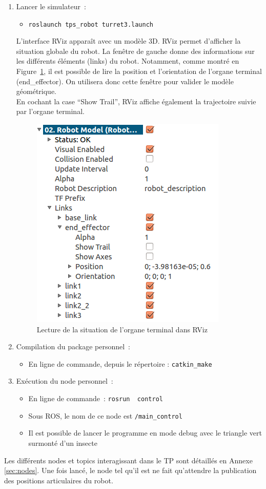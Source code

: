 \documentclass[12pt,a4paper]{article}
\begin{document}
\begin{enumerate}

\item Lancer le simulateur~: 
\begin{itemize}
\item \texttt{roslaunch tps\_robot turret3.launch}
\end{itemize}
L'interface RViz apparaît avec un modèle 3D. RViz permet d'afficher la situation globale du robot. La fenêtre de gauche donne des informations sur les différents éléments (links) du robot. Notamment, comme montré en Figure~\ref{fig:rviz}, il est possible de lire la position et l'orientation de l'organe terminal (end\_effector).  On utilisera donc cette fenêtre pour valider le modèle géométrique.\\
En cochant la case ``Show Trail'', RViz affiche également la trajectoire suivie par l'organe terminal.

\begin{figure}[h]\centering
\includegraphics[width=.3\linewidth]{rviz}
\caption{Lecture de la situation de l'organe terminal dans RViz}
\label{fig:rviz}
\end{figure} 

\item Compilation du package personnel~: 
\begin{itemize}
\item En ligne de commande, depuis le répertoire \texttt{\ros}: \texttt{catkin\_make}
\end{itemize}
 \item Exécution du node personnel~:
\begin{itemize}
\item En ligne de commande~:  \texttt{rosrun \bin~control}
\item Sous ROS, le nom de ce node est \texttt{/main\_control}
\item Il est possible de lancer le programme en mode debug avec le triangle vert surmonté d'un insecte
\end{itemize}
\end{enumerate}
Les différents nodes et topics interagissant dans le TP sont détaillés en Annexe \ref{sec:nodes}.
Une fois lancé, le node tel qu'il est ne fait qu'attendre la publication des positions articulaires du robot.
\end{document}

